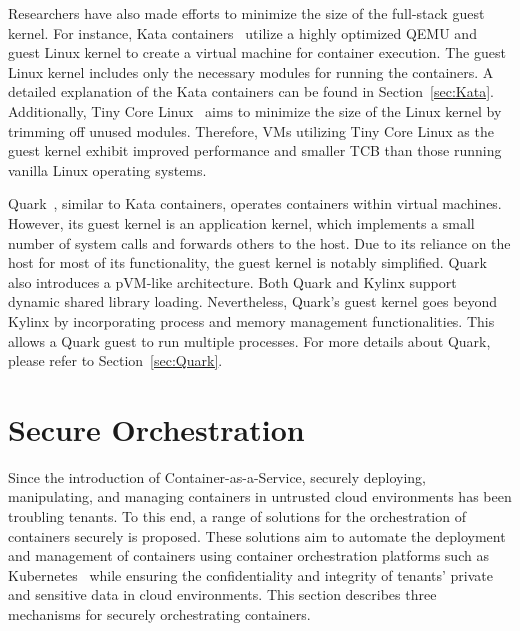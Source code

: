 Researchers have also made efforts to minimize the size of the full-stack guest kernel. For instance, Kata containers~\cite*{Kata-Containers} utilize a highly optimized QEMU and guest Linux kernel to create a virtual machine for container execution. The guest Linux kernel includes only the necessary modules for running the containers. 
A detailed explanation of the Kata containers can be found in Section~\ref{sec:Kata}. Additionally, Tiny Core Linux~\cite*{tiny_linux} aims to minimize the size of the Linux kernel by trimming off unused modules. Therefore, VMs utilizing Tiny Core Linux as the guest kernel exhibit 
improved performance and smaller \acrshort{TCB} than those running vanilla Linux operating systems.


Quark~\cite*{quark}, similar to Kata containers, operates containers within virtual machines. However, its guest kernel is an application kernel, which implements a small number of system calls and forwards others to the host. Due to its reliance on the host for most of its functionality, 
the guest kernel is notably simplified. Quark also introduces a pVM-like architecture. Both Quark and Kylinx support dynamic shared library loading. Nevertheless, Quark's guest kernel goes beyond Kylinx by incorporating process and memory management functionalities. This allows a 
Quark guest to run multiple processes. For more details about Quark, please refer to Section~\ref{sec:Quark}.


\section{Secure Orchestration}
Since the introduction of Container-as-a-Service, securely deploying, manipulating, and managing containers in untrusted cloud environments has been troubling tenants. To this end, a range of solutions for the orchestration of containers securely is proposed. These solutions aim to automate the 
deployment and management of containers using container orchestration platforms such as Kubernetes~\cite*{k8s} while ensuring the confidentiality and integrity of tenants' private and sensitive data in cloud environments. This section describes three mechanisms for securely orchestrating containers.

